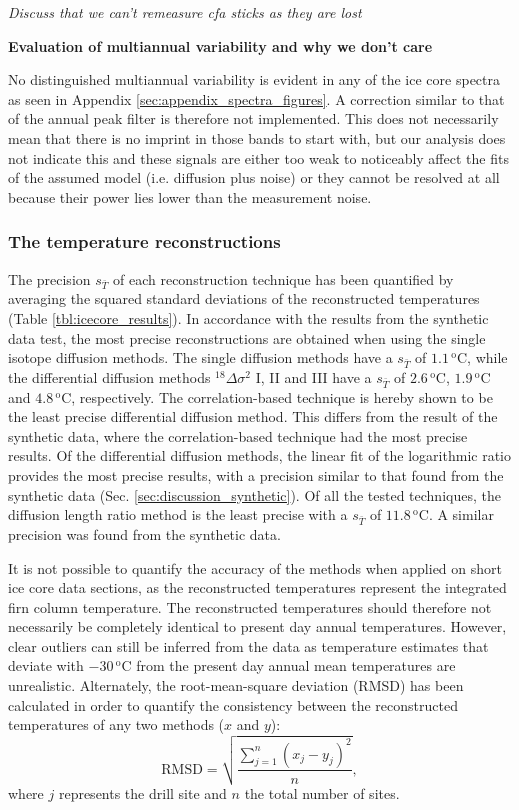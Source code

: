 \documentclass[11pt, draftcls, onecolumn]{IEEEtran} %
\numberwithin{equation}{section}
\numberwithin{table}{section}
\numberwithin{figure}{section}
\begin{document}
\textit{Discuss that we can't remeasure cfa sticks as they are lost}

\textbf{Evaluation of multiannual variability and why we don't care}

No distinguished multiannual variability is evident in any of the ice core spectra as seen in Appendix \ref{sec:appendix_spectra_figures}.
A correction similar to that of the annual peak filter is therefore not implemented.
This does not necessarily mean that there is no imprint in those bands to start with, 
but our analysis does not indicate this and these signals are either too weak to noticeably 
affect the fits of the assumed model (i.e. diffusion plus noise)
or they cannot be resolved at all because their power lies lower than the measurement noise.

\subsubsection{The temperature reconstructions}
The precision $s_{\bar{T}}$ of each reconstruction technique has been quantified
by averaging the squared standard deviations of the reconstructed temperatures (Table \ref{tbl:icecore_results}). 
In accordance with the results from the synthetic data test, the most precise reconstructions are obtained when using the single isotope diffusion methods. 
The single diffusion methods have a $s_{\bar{T}}$ of $1.1\,^\mathrm{o}\mathrm{C}$, while the differential diffusion methods ${}^{18}\Delta\sigma^2$ I, II and III
have a $s_{\bar{T}}$ of $2.6\,^\mathrm{o}\mathrm{C}$,
$1.9\,^\mathrm{o}\mathrm{C}$ and $4.8\,^\mathrm{o}\mathrm{C}$, respectively.
The correlation-based technique is hereby shown to be the least precise differential diffusion method.
This differs from the result of the synthetic data, where the correlation-based technique
had the most precise results. 
Of the differential diffusion methods, the linear fit of the logarithmic ratio provides the most precise results, 
with a precision similar to that found from the synthetic data (Sec. \ref{sec:discussion_synthetic}).
Of all the tested techniques, the diffusion length ratio method is the least precise with 
a $s_{\bar{T}}$ of $11.8\,^\mathrm{o}\mathrm{C}$. 
A similar precision was found from the synthetic data.

It is not possible to quantify the accuracy of the methods when applied on short ice core data sections,
as the reconstructed temperatures represent the integrated firn column temperature.
The reconstructed temperatures should therefore not necessarily be completely identical to present day annual temperatures.
However, clear outliers can still be inferred from the data as temperature estimates that deviate with
$-30\,^\mathrm{o}\mathrm{C}$ from the present day annual mean temperatures are unrealistic.
Alternately, the root-mean-square deviation (RMSD) has been calculated in order to quantify the consistency between the
reconstructed temperatures of any two methods ($x$ and $y$):
\begin{equation}
\mathrm{RMSD} = \sqrt{\frac{\sum_{j = 1}^{n} \left(x_j - y_j\right)^2}{n}},
\end{equation}
where $j$ represents the drill site and $n$ the total number of sites.
\end{document}
